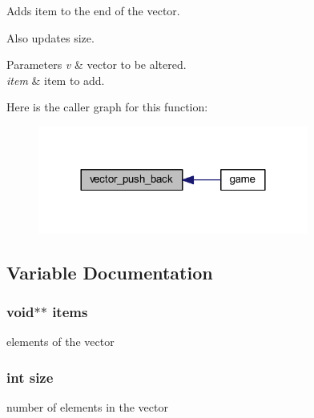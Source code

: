 Adds item to the end of the vector. 

Also updates size.


\begin{DoxyParams}{Parameters}
{\em v} & vector to be altered. \\
\hline
{\em item} & item to add. \\
\hline
\end{DoxyParams}


Here is the caller graph for this function\+:\nopagebreak
\begin{figure}[H]
\begin{center}
\leavevmode
\includegraphics[width=252pt]{group__vector_ga085e5c2ac696df22b2b2ae8326d03a84_icgraph}
\end{center}
\end{figure}




\subsection{Variable Documentation}
\hypertarget{group__vector_ga94977134c19c2c536550e6b13d69218d}{}
\subsubsection[{items}]{\setlength{\rightskip}{0pt plus 5cm}void$\ast$$\ast$ items}\label{group__vector_ga94977134c19c2c536550e6b13d69218d}
elements of the vector \hypertarget{group__vector_ga439227feff9d7f55384e8780cfc2eb82}{}
\subsubsection[{size}]{\setlength{\rightskip}{0pt plus 5cm}int size}\label{group__vector_ga439227feff9d7f55384e8780cfc2eb82}
number of elements in the vector 
